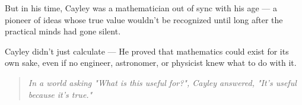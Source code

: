 \begin{tcolorbox}[colback=gray!5!white, colframe=gray!50!black, title={Historical Sidebar: Cayley — The Abstract Rebel in a Practical Age}, breakable]
    But in his time, Cayley was a mathematician out of sync with his age — a pioneer of ideas whose true value wouldn’t be recognized until long after the practical minds had gone silent.
    
    \begin{tcolorbox}[colback=white, colframe=gray!50!black, title={When Abstraction Was a Dirty Word}, fonttitle=\bfseries]
    Cayley didn’t just calculate —  
    He proved that mathematics could exist for its own sake,  
    even if no engineer, astronomer, or physicist knew what to do with it.
    \end{tcolorbox}
    
    \begin{quote}
    \textit{In a world asking "What is this useful for?",  
    Cayley answered, "It’s useful because it’s true."}
    \end{quote}
    
\end{tcolorbox}
